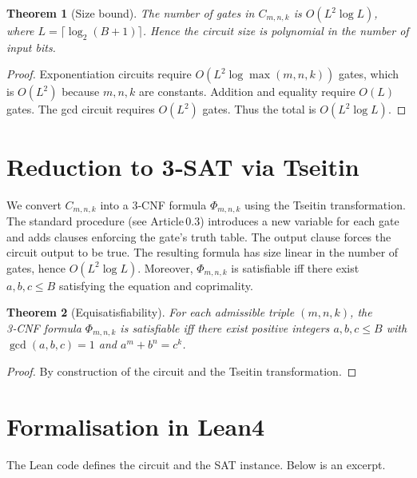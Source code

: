 \documentclass[11pt,a4paper]{article}
\newtheorem{theorem}{Theorem}[section]
\begin{document}
\begin{theorem}[Size bound]
\label{thm:size}
The number of gates in \(C_{m,n,k}\) is \(O(L^2 \log L)\), where \(L = \lceil \log_2(B+1)\rceil\). Hence the circuit size is polynomial in the number of input bits.
\end{theorem}
\begin{proof}
Exponentiation circuits require \(O(L^2 \log \max(m,n,k))\) gates, which is \(O(L^2)\) because \(m,n,k\) are constants. Addition and equality require \(O(L)\) gates. The gcd circuit requires \(O(L^2)\) gates. Thus the total is \(O(L^2 \log L)\).
\end{proof}

\section{Reduction to 3‑SAT via Tseitin}

We convert \(C_{m,n,k}\) into a 3‑CNF formula \(\Phi_{m,n,k}\) using the Tseitin transformation. The standard procedure (see Article 0.3) introduces a new variable for each gate and adds clauses enforcing the gate’s truth table. The output clause forces the circuit output to be true. The resulting formula has size linear in the number of gates, hence \(O(L^2 \log L)\). Moreover, \(\Phi_{m,n,k}\) is satisfiable iff there exist \(a,b,c\le B\) satisfying the equation and coprimality.

\begin{theorem}[Equisatisfiability]
\label{thm:equiv}
For each admissible triple \((m,n,k)\), the 3‑CNF formula \(\Phi_{m,n,k}\) is satisfiable iff there exist positive integers \(a,b,c\le B\) with \(\gcd(a,b,c)=1\) and \(a^m+b^n=c^k\).
\end{theorem}
\begin{proof}
By construction of the circuit and the Tseitin transformation.
\end{proof}

\section{Formalisation in Lean4}

The Lean code defines the circuit and the SAT instance. Below is an excerpt.
\end{document}
